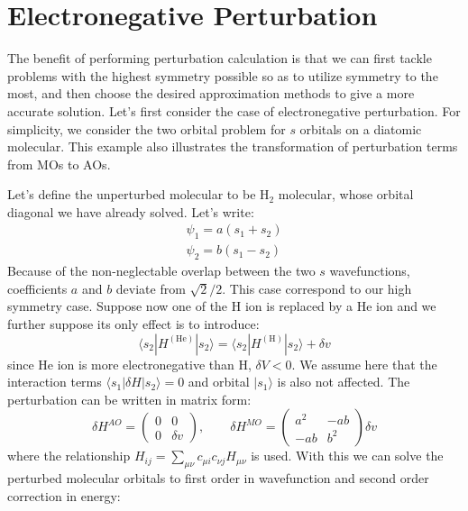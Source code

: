 \documentclass{article}
\newcommand{\statebra}[1]{\langle #1 |}
\newcommand{\stateket}[1]{| #1 \rangle}
\begin{document}
\section{Electronegative Perturbation}
The benefit of performing perturbation calculation is that we can first tackle 
problems with the highest symmetry possible so as to utilize symmetry to the most,
and then choose the desired approximation methods to give a more accurate 
solution. Let's first consider the case of electronegative perturbation. For simplicity, 
we consider the two orbital problem for $s$ orbitals on a diatomic molecular. This 
example also illustrates the transformation of perturbation terms from MOs to AOs. 

Let's define the unperturbed molecular to be H$_2$ molecular, whose orbital diagonal we 
have already solved. Let's write:
\begin{align*}
    \psi_1 = a (s_1 + s_2) \\ 
    \psi_2 = b (s_1 - s_2)
\end{align*}
Because of the non-neglectable overlap between the two $s$ wavefunctions, coefficients $a$ and $b$
deviate from $\sqrt{2}/2$. 
This case correspond to our high symmetry case. Suppose now one of the 
H ion is replaced by a He ion and we further suppose its only effect is to introduce:
\begin{equation*}
    \statebra{s_2} H^{(\text{He})} \stateket{s_2} = \statebra{s_2} H^{(\text{H})} \stateket{s_2} + \delta v
\end{equation*}
since He ion is more electronegative than H, $\delta V < 0$. We assume here that the interaction 
terms $\statebra{s_1} \delta H \stateket{s_2} = 0$ and orbital $\stateket{s_1}$ is also not affected. The perturbation 
can be written in matrix form:
\begin{equation*}
    \delta H^{AO} = \left(\begin{matrix}
        0 & 0 \\ 0 & \delta v
    \end{matrix}\right), \qquad 
    \delta H^{MO} = \left(\begin{matrix}
        a^2 & -ab  \\ -ab  & b^2
    \end{matrix}\right) \delta v
\end{equation*}
where the relationship $H_{ij} = \sum_{\mu \nu} c_{\mu i} c_{\nu j} H_{\mu \nu}$ is used. With this we can solve 
the perturbed molecular orbitals to first order in wavefunction and second order correction in energy:
\end{document}
